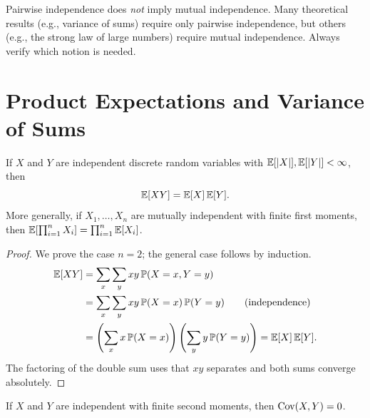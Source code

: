 \documentclass[11pt,a4paper]{article}
\begin{document}
\begin{warning}[title={Pairwise $\neq$ Mutual}]
Pairwise independence does \emph{not} imply mutual independence.
Many theoretical results (e.g., variance of sums) require only
pairwise independence, but others (e.g., the strong law of large
numbers) require mutual independence.  Always verify which notion
is needed.
\end{warning}


\section{Product Expectations and Variance of Sums}
\label{sec:products}

\begin{keyresult}[title={Product of Expectations under Independence}]
\begin{theorem}
\label{thm:product_exp}
If $X$ and $Y$ are independent discrete random variables with
$\mathbb{E}[|X|], \mathbb{E}[|Y|] < \infty$, then
\begin{equation}
  \mathbb{E}[XY] = \mathbb{E}[X]\, \mathbb{E}[Y].
  \label{eq:product_exp}
\end{equation}
More generally, if $X_1, \ldots, X_n$ are mutually independent
with finite first moments, then
$\mathbb{E}[\prod_{i=1}^n X_i] = \prod_{i=1}^n \mathbb{E}[X_i]$.
\end{theorem}
\end{keyresult}

\begin{proof}
We prove the case $n = 2$; the general case follows by induction.
\begin{align}
  \mathbb{E}[XY]
  &= \sum_x \sum_y xy\, \mathbb{P}(X = x, Y = y)
  \nonumber\\
  &= \sum_x \sum_y xy\, \mathbb{P}(X = x)\, \mathbb{P}(Y = y)
  \tag{independence}\\
  &= \left(\sum_x x\, \mathbb{P}(X = x)\right)
    \left(\sum_y y\, \mathbb{P}(Y = y)\right)
  = \mathbb{E}[X]\, \mathbb{E}[Y].
  \label{eq:product_proof}
\end{align}
The factoring of the double sum uses that $xy$ separates and both
sums converge absolutely.
\end{proof}

\begin{corollary}
\label{cor:cov_indep}
If $X$ and $Y$ are independent with finite second moments, then
$\operatorname{Cov}(X, Y) = 0$.
\end{corollary}
\end{document}
